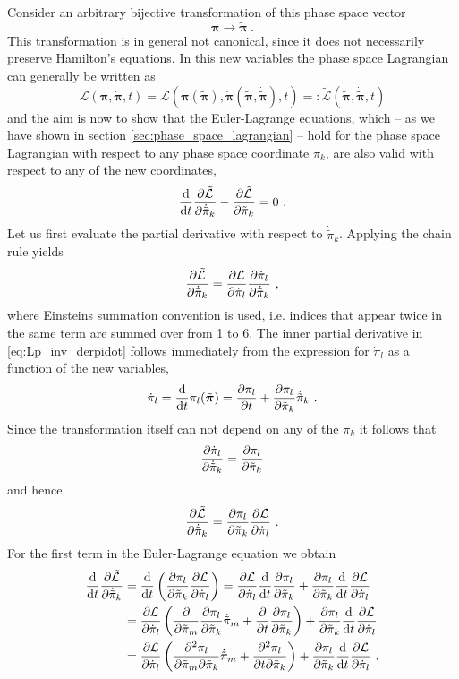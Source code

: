 \documentclass{scrartcl}
\renewcommand{\vec}[1]{\boldsymbol{#1}}
\newcommand{\pid}{\dot{\pi}}
\newcommand{\pit}{\tilde{\pi}}
\newcommand{\pitd}{\dot{\tilde{\pi}}}
\newcommand{\pivd}{\dot{\vec{\pi}}}
\newcommand{\pivt}{\tilde{\vec{\pi}}}
\newcommand{\pivtd}{\dot{\tilde{\vec{\pi}}}}
\newcommand{\PSL}{\mathcal{L}}
\begin{document}
Consider an arbitrary bijective transformation of this phase space vector
\begin{equation*}
\vec{\pi} \rightarrow \pivt \ .
\end{equation*}
This transformation is in general not canonical, since it does not necessarily preserve Hamilton's equations. In this new variables the phase space Lagrangian can generally be written as
\begin{equation*}
\PSL(\vec{\pi},\pivd,t) = \PSL(\vec{\pi}(\pivt),\pivd(\pivt,\pivtd),t) =: \tilde{\PSL}(\pivt, \pivtd, t)
\end{equation*}
and the aim is now to show that the Euler-Lagrange equations, which -- as we have shown in section \ref{sec:phase_space_lagrangian} -- hold for the phase space Lagrangian with respect to any phase space coordinate $\pi_k$, are also valid with respect to any of the new coordinates,
\begin{equation}\label{eq:Lp_eulerlagrange_pitilde}
\dv{t} \pdv{\tilde{\PSL}}{\pitd_k} - \pdv{\tilde{\PSL}}{\pit_k} = 0 \ .
\end{equation}
Let us first evaluate the partial derivative with respect to $\pitd_k$. Applying the chain rule yields
\begin{equation} \label{eq:Lp_inv_derpidot}
\pdv{\tilde{\PSL}}{\pitd_k} = \pdv{\PSL}{\pid_l}\pdv{\pid_l}{\pitd_k} \ ,
\end{equation}
where Einsteins summation convention is used, i.e. indices that appear twice in the same term are summed over from 1 to 6. The inner partial derivative in \eqref{eq:Lp_inv_derpidot} follows immediately from the expression for $\pid_l$ as a function of the new variables,
\begin{equation}\label{eq:Lp_inv_pidot}
\pid_l = \dv{t}\pi_l(\pivt) = \pdv{\pi_l}{t} + \pdv{\pi_l}{\pit_k}\pitd_k \ .
\end{equation}
Since the transformation itself can not depend on any of the $\pid_k$ it follows that
\begin{equation*}
\pdv{\pid_l}{\pitd_k} = \pdv{\pi_l}{\pit_k}
\end{equation*}
and hence
\begin{equation*}
\pdv{\tilde{\PSL}}{\pitd_k} = \pdv{\pi_l}{\pit_k}\pdv{\PSL}{\pid_l} \ .
\end{equation*}
For the first term in the Euler-Lagrange equation we obtain
\begin{align}
\dv{t} \pdv{\tilde{\PSL}}{\pitd_k} &= \dv{t}\left(\pdv{\pi_l}{\pit_k}\pdv{\PSL}{\pid_l}\right) = \pdv{\PSL}{\pid_l}\dv{t}\pdv{\pi_l}{\pit_k} + \pdv{\pi_l}{\pit_k}\dv{t}\pdv{\PSL}{\pid_l} \nonumber\\
&= \pdv{\PSL}{\pid_l}\left(\pdv{\pit_m}\pdv{\pi_l}{\pit_k}\pitd_m + \pdv{t}\pdv{\pi_l}{\pit_k}\right) + \pdv{\pi_l}{\pit_k}\dv{t}\pdv{\PSL}{\pid_l} \nonumber\\
&= \pdv{\PSL}{\pid_l}\left(\pdv[2]{\pi_l}{\pit_m}{\pit_k}\pitd_m + \pdv[2]{\pi_l}{t}{\pit_k}\right) + \pdv{\pi_l}{\pit_k}\dv{t}\pdv{\PSL}{\pid_l} \ .
\label{eq:Lp_eulerlagrange_termone}
\end{align}
\end{document}
